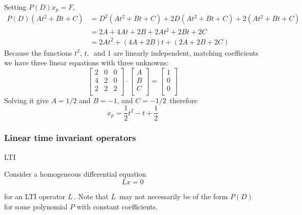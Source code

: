 \begin{enumerate}
    Setting $P(D)x_ p= F$,
    \begin{align*}
      P(D)(At^2+Bt+C)
      &= D^2(At^2+Bt+C) + 2D(At^2+Bt+C) + 2(At^2+Bt+C) \\
      &= 2A + 4At + 2B + 2At^2 + 2Bt + 2C \\
      &= 2At^2 + (4A + 2B)t + (2A + 2B + 2C)                        
    \end{align*}
    Because the functions $t^2,\, t,\, $ and $1$ are linearly independent,
    matching coefficients we have three linear equations with three unknowns:
    \[
      \begin{bmatrix}
        2 & 0 & 0 \\
        4 & 2 & 0 \\
        2 & 2 & 2 \\
      \end{bmatrix}
      \cdot
      \begin{bmatrix}
        A \\
        B \\
        C \\
      \end{bmatrix}
      =
      \begin{bmatrix}
        1 \\
        0 \\
        0 \\
      \end{bmatrix}
    \]   
    Solving it give $A = 1/2$ and $B = -1$, and $C =-1/2 \,$ therefore
    \begin{equation*}
      x _p = \frac{1}{2} t^2  - t + \frac{1}{2}  
    \end{equation*}
\end{enumerate}

\clearpage
\subsubsection{Linear time invariant operators}

\begin{homework}
  LTI
\end{homework}

Consider a homogeneous differential equation
\begin{equation*}
  L x = 0
\end{equation*}

for an LTI operator $L\,$.
Note that $L\,$ may not necessarily be of the form $P(D)\,$
for some polynomial $P$ with constant coefficients.\\

